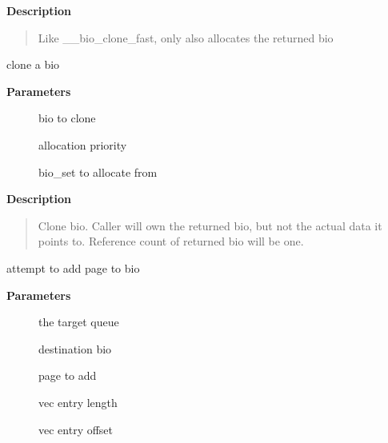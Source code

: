 \documentclass[a4paper,8pt,english]{sphinxmanual}
\begin{document}
\textbf{Description}
\begin{quote}

Like \_\_bio\_clone\_fast, only also allocates the returned bio
\end{quote}

\begin{fulllineitems}
\label{filesystems/index:c.bio_clone_bioset}
clone a bio

\end{fulllineitems}


\textbf{Parameters}
\begin{description}
\item[{}] \leavevmode
bio to clone

\item[{}] \leavevmode
allocation priority

\item[{}] \leavevmode
bio\_set to allocate from

\end{description}

\textbf{Description}
\begin{quote}

Clone bio. Caller will own the returned bio, but not the actual data it
points to. Reference count of returned bio will be one.
\end{quote}

\begin{fulllineitems}
\label{filesystems/index:c.bio_add_pc_page}
attempt to add page to bio

\end{fulllineitems}


\textbf{Parameters}
\begin{description}
\item[{}] \leavevmode
the target queue

\item[{}] \leavevmode
destination bio

\item[{}] \leavevmode
page to add

\item[{}] \leavevmode
vec entry length

\item[{}] \leavevmode
vec entry offset

\end{description}
\end{document}
